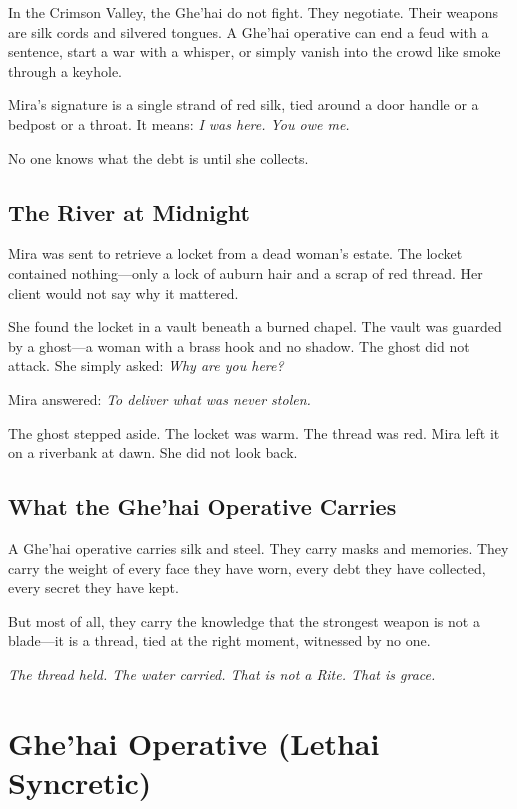 In the Crimson Valley, the Ghe'hai do not fight. They negotiate. Their weapons are silk cords and silvered tongues. A Ghe'hai operative can end a feud with a sentence, start a war with a whisper, or simply vanish into the crowd like smoke through a keyhole.

Mira's signature is a single strand of red silk, tied around a door handle or a bedpost or a throat. It means: \textit{I was here. You owe me.}

No one knows what the debt is until she collects.

\subsection{The River at Midnight}

Mira was sent to retrieve a locket from a dead woman's estate. The locket contained nothing—only a lock of auburn hair and a scrap of red thread. Her client would not say why it mattered.

She found the locket in a vault beneath a burned chapel. The vault was guarded by a ghost—a woman with a brass hook and no shadow. The ghost did not attack. She simply asked: \textit{Why are you here?}

Mira answered: \textit{To deliver what was never stolen.}

The ghost stepped aside. The locket was warm. The thread was red. Mira left it on a riverbank at dawn. She did not look back.

\subsection{What the Ghe'hai Operative Carries}

A Ghe'hai operative carries silk and steel. They carry masks and memories. They carry the weight of every face they have worn, every debt they have collected, every secret they have kept.

But most of all, they carry the knowledge that the strongest weapon is not a blade—it is a thread, tied at the right moment, witnessed by no one.

\vspace{1em}
\begin{center}
\textit{The thread held. The water carried. That is not a Rite. That is grace.}
\end{center}

\section{Ghe'hai Operative (Lethai Syncretic)}

